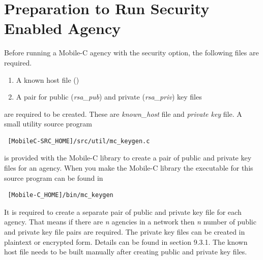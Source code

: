 \documentclass[11pt]{report}
\begin{document}

\section{Preparation to Run Security Enabled Agency}
Before running a Mobile-C agency with the security option, 
  the following files are required.
\begin{enumerate}
\item A known host file ()
\item A pair for public (\textit{rsa\_pub}) and private 
      (\textit{rsa\_priv}) key files
\end{enumerate} 
  are required to be created. 
These are \textit{known\_host} file and \textit{private key} file.  
A small utility source program 
  \begin{verbatim} [MobileC-SRC_HOME]/src/util/mc_keygen.c \end{verbatim} 
  is provided with the Mobile-C library to create a pair of public 
  and private key files for an agency. 
When you make the Mobile-C library the executable for this source program
  can be found in 
  \begin{verbatim} [Mobile-C_HOME]/bin/mc_keygen \end{verbatim}
It is required to create a separate pair of public and private key file
  for each agency. 
That means if there are \textit{n} agencies in a network then \textit{n}
  number of public and private key file pairs are required.
The private key files can be created in plaintext or encrypted 
  form. Details can be found in section 9.3.1.
The known host file needs to be built manually after creating public
  and private key files.

\end{document}
